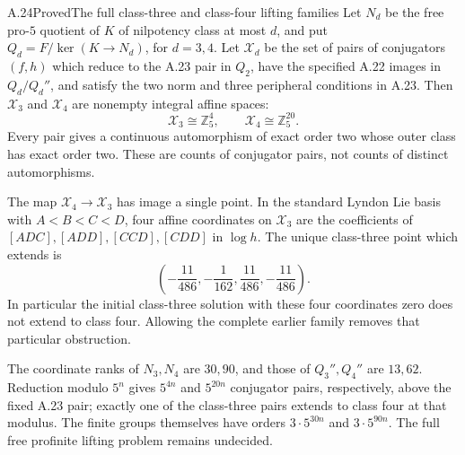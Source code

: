 \begin{statement}{A.24}{Proved}{The full class-three and class-four lifting families}
Let $N_d$ be the free pro-$5$ quotient of $K$ of
nilpotency class at most $d$, and put
$Q_d=F/\ker(K\to N_d)$, for $d=3,4$.
Let $\mathcal X_d$ be the set of pairs of conjugators
$(f,h)$ which reduce to the A.23 pair in $Q_2$,
have the specified A.22 images in $Q_d/Q_d''$,
and satisfy the two norm and three peripheral
conditions in A.23.
Then $\mathcal X_3$ and $\mathcal X_4$ are nonempty
integral affine spaces:
\[
             \mathcal X_3\cong\mathbb Z_5^4,\qquad
             \mathcal X_4\cong\mathbb Z_5^{20}.
\]
Every pair gives a continuous automorphism of exact
order two whose outer class has exact order two.
These are counts of conjugator pairs, not counts of
distinct automorphisms.

The map $\mathcal X_4\to\mathcal X_3$ has image a
single point. In the standard Lyndon Lie basis with
$A<B<C<D$, four affine coordinates on $\mathcal X_3$
are the coefficients of
$[ADC],[ADD],[CCD],[CDD]$ in $\log h$.
The unique class-three point which extends is
\[
 \left(-\frac{11}{486},-\frac1{162},
              \frac{11}{486},-\frac{11}{486}\right).
                                                               \tag{A--III}
\]
In particular the initial class-three solution with
these four coordinates zero does not extend to
class four. Allowing the complete earlier family
removes that particular obstruction.

The coordinate ranks of $N_3,N_4$ are $30,90$,
and those of $Q_3'',Q_4''$ are $13,62$.
Reduction modulo $5^n$ gives $5^{4n}$ and
$5^{20n}$ conjugator pairs, respectively, above the
fixed A.23 pair; exactly one of the class-three
pairs extends to class four at that modulus.
The finite groups themselves have orders
$3\cdot5^{30n}$ and $3\cdot5^{90n}$.
The full free profinite lifting problem remains undecided.
\end{statement}
